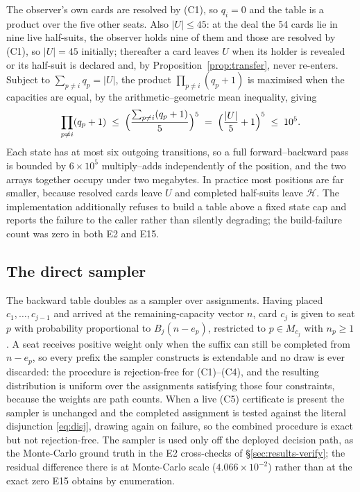 \documentclass[11pt]{article}
\theoremstyle{definition}
\newcommand{\numBeliefVsSampling}{4.066\times 10^{-2}}
\begin{document}
The observer's own cards are resolved by (C1), so $q_i = 0$ and the table is a
product over the five other seats. Also $|U| \le 45$: at the deal the 54 cards
lie in nine live half-suits, the observer holds nine of them and those are
resolved by (C1), so $|U| = 45$ initially; thereafter a card leaves $U$ when its
holder is revealed or its half-suit is declared and, by
Proposition~\ref{prop:transfer}, never re-enters. Subject to $\sum_{p\ne i} q_p =
|U|$, the product $\prod_{p \ne i}(q_p+1)$ is maximised when the capacities are
equal, by the arithmetic--geometric mean inequality, giving
\begin{equation}
  \prod_{p\ne i}(q_p+1) \;\le\; \Bigl(\frac{\sum_{p \ne i}(q_p+1)}{5}\Bigr)^{5}
  \;=\; \Bigl(\frac{|U|}{5}+1\Bigr)^{5} \;\le\; 10^{5}.
  \label{eq:bound}
\end{equation}
Each state has at most six outgoing transitions, so a
full forward--backward pass is bounded by $6 \times 10^5$ multiply--adds
independently of the position, and the two arrays together occupy under two
megabytes. In practice most positions are far smaller, because resolved cards
leave $U$ and completed half-suits leave $\mathcal{H}$. The implementation
additionally refuses to build a table above a fixed state cap and reports the
failure to the caller rather than silently degrading; the build-failure count was
zero in both E2 and E15.

\subsection{The direct sampler}
\label{app:sampler}

The backward table doubles as a sampler over assignments. Having placed
$c_1,\dots,c_{j-1}$ and arrived at the remaining-capacity vector $n$, card $c_j$
is given to seat $p$ with probability proportional to $B_j(n - e_p)$, restricted
to $p \in M_{c_j}$ with $n_p \ge 1$. A seat receives positive weight only when
the suffix can still be completed from $n - e_p$, so every prefix the sampler
constructs is extendable and no draw is ever discarded: the procedure is
rejection-free for (C1)--(C4), and the resulting distribution is uniform over the
assignments satisfying those four constraints, because the weights are
path counts. When a live (C5) certificate is present the sampler is unchanged and
the completed assignment is tested against the literal disjunction
\eqref{eq:disj}, drawing again on failure, so the combined procedure is exact but
not rejection-free. The sampler
is used only off the deployed decision path, as the Monte-Carlo ground truth in
the E2 cross-checks of \S\ref{sec:results-verify}; the residual difference there
is at Monte-Carlo scale ($\numBeliefVsSampling$) rather than at the exact zero
E15 obtains by enumeration.
\end{document}
